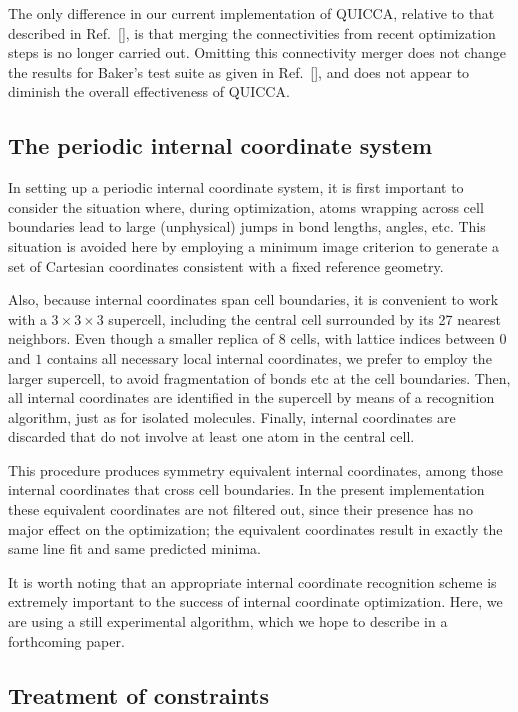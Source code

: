 \twolinestyle{\documentclass[prb,preprint]{revtex4}}
\begin{document}
The only difference in our current implementation of QUICCA, relative
to that described in Ref.~[], is that merging 
the connectivities from recent optimization steps is no longer carried out.
Omitting this connectivity merger does not change the results for Baker's 
test suite as given in Ref.~[], and does not appear
to diminish the overall effectiveness of QUICCA.

\subsection{The periodic internal coordinate system}

In setting up a periodic internal coordinate system, it is first 
important to consider the situation where, during optimization, atoms 
wrapping across cell boundaries lead to large (unphysical) jumps in 
bond lengths, angles, etc.  This situation is avoided here by employing a minimum 
image criterion to generate a set of Cartesian coordinates consistent 
with a fixed reference geometry.  

Also, because internal coordinates span cell boundaries, it is 
convenient to work with a $3\times3\times3$ supercell,
including the central cell surrounded by its 27 nearest neighbors.
Even though a smaller replica of 8 cells, with lattice indices
between $0$ and $1$ contains all necessary local internal coordinates,
we prefer to employ the larger supercell, to avoid fragmentation
of bonds etc at the cell boundaries.  Then, all internal coordinates 
are identified in the supercell by means of a recognition algorithm,
just as for isolated molecules.  Finally, internal coordinates are discarded 
that do not involve at least one atom in the central cell. 

This procedure produces symmetry equivalent internal coordinates, 
among those internal coordinates that cross cell boundaries.
In the present implementation these equivalent coordinates are not 
filtered out, since their presence has no major effect on the optimization;
the equivalent coordinates result in exactly the same line fit and same
predicted minima.

It is worth noting that an appropriate internal coordinate 
recognition scheme is extremely important to the success of internal 
coordinate optimization.  Here, we are using a still experimental algorithm, 
which we hope to describe in a forthcoming paper.

\subsection{Treatment of constraints}
\end{document}
